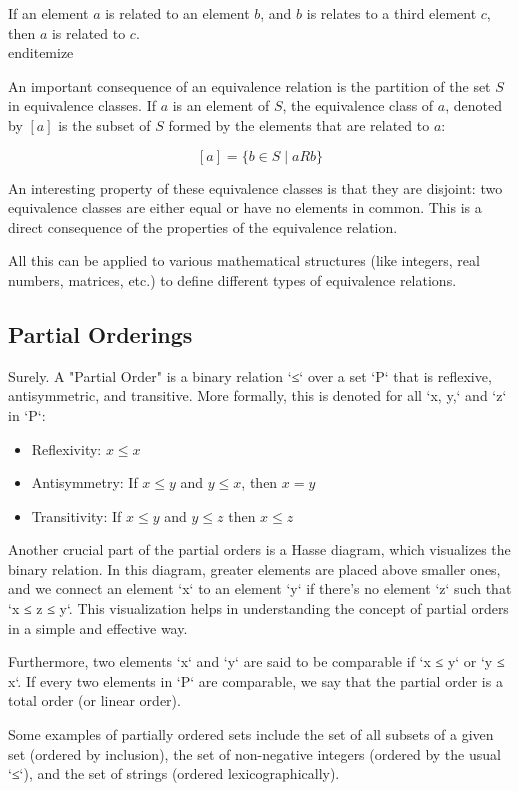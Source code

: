     If an element $a$ is related to an element $b$, and $b$ is relates to a third element $c$, then $a$ is related to $c$.
\\end{itemize}

An important consequence of an equivalence relation is the partition of the set $S$ in equivalence classes. If $a$ is an element of $S$, the equivalence class of $a$, denoted by $[a]$ is the subset of $S$ formed by the elements that are related to $a$:

$$
[a] = \{b \in S \mid aRb\}
$$

An interesting property of these equivalence classes is that they are disjoint: two equivalence classes are either equal or have no elements in common. This is a direct consequence of the properties of the equivalence relation. 

All this can be applied to various mathematical structures (like integers, real numbers, matrices, etc.) to define different types of equivalence relations.

\subsection{Partial Orderings}
Surely. A "Partial Order" is a binary relation `≤` over a set `P` that is reflexive, antisymmetric, and transitive. More formally, this is denoted for all `x, y,` and `z` in `P`:

\begin{itemize}
\item Reflexivity: 	$x \leq x$
\item Antisymmetry:  	If $x \leq y$ and $y \leq x$, then $x = y$
\item Transitivity: 	If $x \leq y$ and $y \leq z$ then $x \leq z$
\end{itemize}

Another crucial part of the partial orders is a Hasse diagram, which visualizes the binary relation. In this diagram, greater elements are placed above smaller ones, and we connect an element `x` to an element `y` if there's no element `z` such that `x ≤ z ≤ y`. This visualization helps in understanding the concept of partial orders in a simple and effective way.

Furthermore, two elements `x` and `y` are said to be comparable if `x ≤ y` or `y ≤ x`. If every two elements in `P` are comparable, we say that the partial order is a total order (or linear order).

Some examples of partially ordered sets include the set of all subsets of a given set (ordered by inclusion), the set of non-negative integers (ordered by the usual `≤`), and the set of strings (ordered lexicographically).


